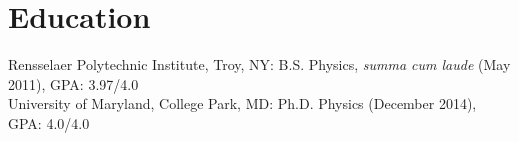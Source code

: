 \section{Education} Rensselaer Polytechnic Institute, Troy, NY: B.S. Physics, \emph{summa cum laude} (May 2011), GPA: 3.97/4.0\\
University of Maryland, College Park, MD: Ph.D. Physics (December 2014), GPA: 4.0/4.0
